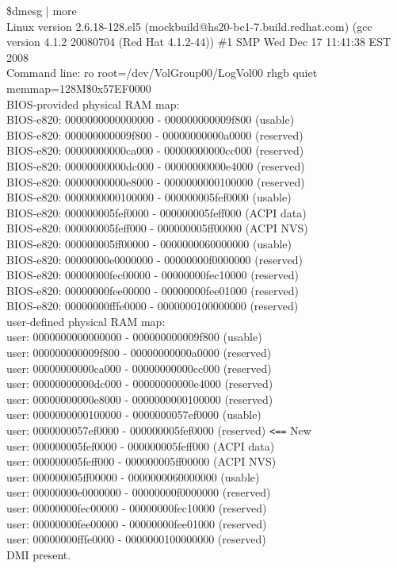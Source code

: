 \begin{flushleft}
\$dmesg | more\\
Linux version 2.6.18-128.el5 (mockbuild@hs20-bc1-7.build.redhat.com) (gcc version 4.1.2 20080704 (Red Hat 4.1.2-44)) \#1 SMP Wed Dec 17 11:41:38 EST 2008 \\
Command line: ro root=/dev/VolGroup00/LogVol00 rhgb quiet memmap=128M\$0x57EF0000\\
BIOS-provided physical RAM map:\\
 BIOS-e820: 0000000000000000 - 000000000009f800 (usable)\\
 BIOS-e820: 000000000009f800 - 00000000000a0000 (reserved)\\
 BIOS-e820: 00000000000ca000 - 00000000000cc000 (reserved)\\
 BIOS-e820: 00000000000dc000 - 00000000000e4000 (reserved)\\
 BIOS-e820: 00000000000e8000 - 0000000000100000 (reserved)\\
 BIOS-e820: 0000000000100000 - 000000005fef0000 (usable)\\
 BIOS-e820: 000000005fef0000 - 000000005feff000 (ACPI data)\\
 BIOS-e820: 000000005feff000 - 000000005ff00000 (ACPI NVS)\\
 BIOS-e820: 000000005ff00000 - 0000000060000000 (usable)\\
 BIOS-e820: 00000000e0000000 - 00000000f0000000 (reserved)\\
 BIOS-e820: 00000000fec00000 - 00000000fec10000 (reserved)\\
 BIOS-e820: 00000000fee00000 - 00000000fee01000 (reserved)\\
 BIOS-e820: 00000000fffe0000 - 0000000100000000 (reserved)\\
user-defined physical RAM map:\\
 user: 0000000000000000 - 000000000009f800 (usable)\\
 user: 000000000009f800 - 00000000000a0000 (reserved)\\
 user: 00000000000ca000 - 00000000000cc000 (reserved)\\
 user: 00000000000dc000 - 00000000000e4000 (reserved)\\
 user: 00000000000e8000 - 0000000000100000 (reserved)\\
 user: 0000000000100000 - 0000000057ef0000 (usable)\\
 user: 0000000057ef0000 - 000000005fef0000 (reserved)  \verb+<==+ New\\
 user: 000000005fef0000 - 000000005feff000 (ACPI data)\\
 user: 000000005feff000 - 000000005ff00000 (ACPI NVS)\\
 user: 000000005ff00000 - 0000000060000000 (usable)\\
 user: 00000000e0000000 - 00000000f0000000 (reserved)\\
 user: 00000000fec00000 - 00000000fec10000 (reserved)\\
 user: 00000000fee00000 - 00000000fee01000 (reserved)\\
 user: 00000000fffe0000 - 0000000100000000 (reserved)\\
DMI present.\\


\end{flushleft}
